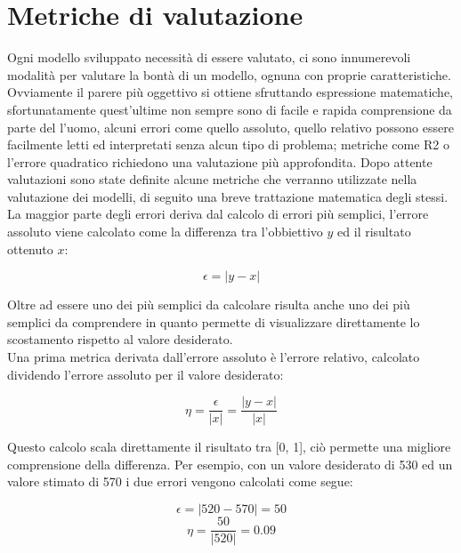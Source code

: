 \documentclass[%
    corpo=12pt,
    twoside,
    oldstyle,
    autoretitolo,
    greek,
    evenboxes,
]{toptesi}
\begin{document}
\section{Metriche di valutazione}
Ogni modello sviluppato necessità di essere valutato, ci sono innumerevoli modalità per valutare la bontà di un modello, ognuna con proprie caratteristiche. Ovviamente il parere più oggettivo si ottiene sfruttando espressione matematiche, sfortunatamente quest'ultime non sempre sono di facile e rapida comprensione da parte del l'uomo, alcuni errori come quello assoluto, quello relativo possono essere facilmente letti ed interpretati senza alcun tipo di problema; metriche come R2 o l'errore quadratico richiedono una valutazione più approfondita. Dopo attente valutazioni sono state definite alcune metriche che verranno utilizzate nella valutazione dei modelli, di seguito una breve trattazione matematica degli stessi.\\
La maggior parte degli errori deriva dal calcolo di errori più semplici, l'errore assoluto viene calcolato come la differenza tra l'obbiettivo $y$ ed il risultato ottenuto $x$:
\begin{center}
  \begin{equation}
    \epsilon = |y - x|
  \end{equation}
\end{center}
Oltre ad essere uno dei più semplici da calcolare risulta anche uno dei più semplici da comprendere in quanto permette di visualizzare direttamente lo scostamento rispetto al valore desiderato.\\
Una prima metrica derivata dall'errore assoluto è l'errore relativo, calcolato dividendo l'errore assoluto per il valore desiderato:
\begin{center}
  \begin{equation}
    \eta = \frac{\epsilon}{|x|} = \frac{|y - x|}{|x|}
  \end{equation}
\end{center}
Questo calcolo scala direttamente il risultato tra [0, 1], ciò permette una migliore comprensione della differenza. Per esempio, con un valore desiderato di 530 ed un valore stimato di 570 i due errori vengono calcolati come segue:
\begin{center}
  \begin{equation}
      \epsilon = |520-570| = 50
  \end{equation}
  \begin{equation}
      \eta = \frac{50}{|520|} = 0.09
  \end{equation}
\end{center}
\end{document}
